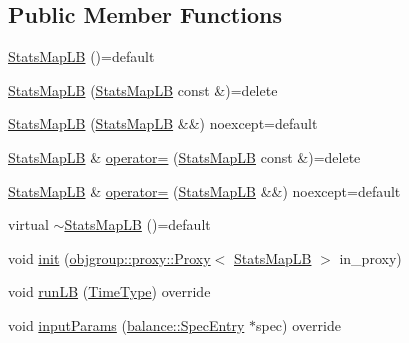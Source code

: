 \subsection*{Public Member Functions}
\begin{DoxyCompactItemize}
\item 
\hyperlink{structvt_1_1vrt_1_1collection_1_1lb_1_1_stats_map_l_b_ae854ea50c2de3fadee41292343301b6d}{Stats\+Map\+LB} ()=default
\item 
\hyperlink{structvt_1_1vrt_1_1collection_1_1lb_1_1_stats_map_l_b_aff22302292a842b662d35393182340a8}{Stats\+Map\+LB} (\hyperlink{structvt_1_1vrt_1_1collection_1_1lb_1_1_stats_map_l_b}{Stats\+Map\+LB} const \&)=delete
\item 
\hyperlink{structvt_1_1vrt_1_1collection_1_1lb_1_1_stats_map_l_b_a999927155e651a8f9906096df0558a71}{Stats\+Map\+LB} (\hyperlink{structvt_1_1vrt_1_1collection_1_1lb_1_1_stats_map_l_b}{Stats\+Map\+LB} \&\&) noexcept=default
\item 
\hyperlink{structvt_1_1vrt_1_1collection_1_1lb_1_1_stats_map_l_b}{Stats\+Map\+LB} \& \hyperlink{structvt_1_1vrt_1_1collection_1_1lb_1_1_stats_map_l_b_a8cf644da07b97637eb00c5384a59ee1e}{operator=} (\hyperlink{structvt_1_1vrt_1_1collection_1_1lb_1_1_stats_map_l_b}{Stats\+Map\+LB} const \&)=delete
\item 
\hyperlink{structvt_1_1vrt_1_1collection_1_1lb_1_1_stats_map_l_b}{Stats\+Map\+LB} \& \hyperlink{structvt_1_1vrt_1_1collection_1_1lb_1_1_stats_map_l_b_aee5bfc8e45ac47056b8b22128bc0f86e}{operator=} (\hyperlink{structvt_1_1vrt_1_1collection_1_1lb_1_1_stats_map_l_b}{Stats\+Map\+LB} \&\&) noexcept=default
\item 
virtual \hyperlink{structvt_1_1vrt_1_1collection_1_1lb_1_1_stats_map_l_b_afd879aa0258b984785b70249c7f06846}{$\sim$\+Stats\+Map\+LB} ()=default
\item 
void \hyperlink{structvt_1_1vrt_1_1collection_1_1lb_1_1_stats_map_l_b_a5af7ebfa026d3b236fee88bc2b5d139e}{init} (\hyperlink{structvt_1_1objgroup_1_1proxy_1_1_proxy}{objgroup\+::proxy\+::\+Proxy}$<$ \hyperlink{structvt_1_1vrt_1_1collection_1_1lb_1_1_stats_map_l_b}{Stats\+Map\+LB} $>$ in\+\_\+proxy)
\item 
void \hyperlink{structvt_1_1vrt_1_1collection_1_1lb_1_1_stats_map_l_b_a74ab28f522582cc78f77f2916884c6d8}{run\+LB} (\hyperlink{namespacevt_a876a9d0cd5a952859c72de8a46881442}{Time\+Type}) override
\item 
void \hyperlink{structvt_1_1vrt_1_1collection_1_1lb_1_1_stats_map_l_b_a495d91782f11c1bb5d1774a05b2a73f6}{input\+Params} (\hyperlink{structvt_1_1vrt_1_1collection_1_1balance_1_1_spec_entry}{balance\+::\+Spec\+Entry} $\ast$spec) override
\end{DoxyCompactItemize}
